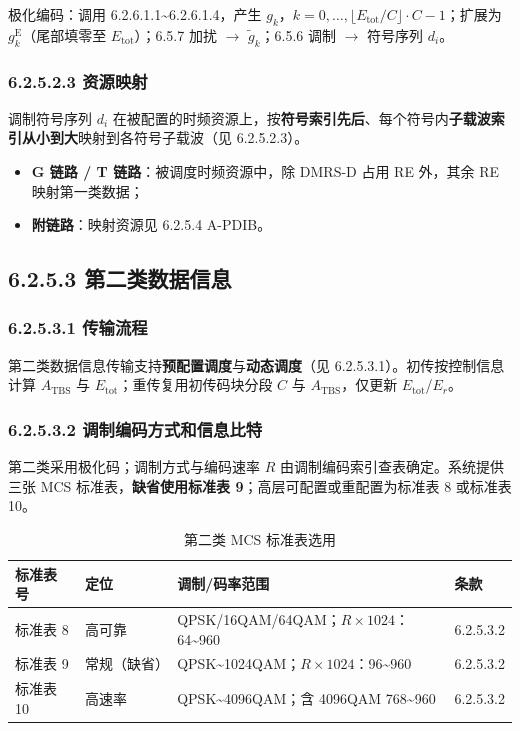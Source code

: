 \documentclass[11pt,a4paper]{ctexart}
\begin{document}
极化编码：调用 6.2.6.1.1\textasciitilde 6.2.6.1.4，产生 $g_k$，$k=0,\ldots,\lfloor E_{\mathrm{tot}}/C\rfloor\cdot C-1$；扩展为 $g^{\mathrm{E}}_k$（尾部填零至 $E_{\mathrm{tot}}$）；6.5.7 加扰 $\rightarrow$ $\tilde{g}_k$；6.5.6 调制 $\rightarrow$ 符号序列 $d_i$。

\subsubsection{6.2.5.2.3 资源映射}

调制符号序列 $d_i$ 在被配置的时频资源上，按\textbf{符号索引先后}、每个符号内\textbf{子载波索引从小到大}映射到各符号子载波（见 6.2.5.2.3）。

\begin{itemize}[nosep]
  \item \textbf{G 链路 / T 链路}：被调度时频资源中，除 DMRS-D 占用 RE 外，其余 RE 映射第一类数据；
  \item \textbf{附链路}：映射资源见 6.2.5.4 A-PDIB。
\end{itemize}

\subsection{6.2.5.3 第二类数据信息}

\subsubsection{6.2.5.3.1 传输流程}

第二类数据信息传输支持\textbf{预配置调度}与\textbf{动态调度}（见 6.2.5.3.1）。初传按控制信息计算 $A_{\mathrm{TBS}}$ 与 $E_{\mathrm{tot}}$；重传复用初传码块分段 $C$ 与 $A_{\mathrm{TBS}}$，仅更新 $E_{\mathrm{tot}}$/$E_r$。

\subsubsection{6.2.5.3.2 调制编码方式和信息比特}

第二类采用极化码；调制方式与编码速率 $R$ 由调制编码索引查表确定。系统提供三张 MCS 标准表，\textbf{缺省使用标准表 9}；高层可配置或重配置为标准表 8 或标准表 10。

\begin{table}[h]
\centering
\small
\caption{第二类 MCS 标准表选用}
\begin{tabular}{llll}
\toprule
\textbf{标准表号} & \textbf{定位} & \textbf{调制/码率范围} & \textbf{条款} \\
\midrule
标准表 8 & 高可靠 & QPSK/16QAM/64QAM；$R{\times}1024$：64\textasciitilde 960 & 6.2.5.3.2 \\
标准表 9 & 常规（缺省） & QPSK\textasciitilde 1024QAM；$R{\times}1024$：96\textasciitilde 960 & 6.2.5.3.2 \\
标准表 10 & 高速率 & QPSK\textasciitilde 4096QAM；含 4096QAM 768\textasciitilde 960 & 6.2.5.3.2 \\
\bottomrule
\end{tabular}
\end{table}
\end{document}

